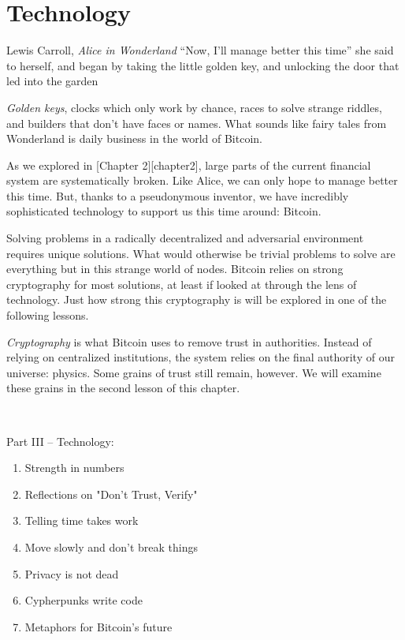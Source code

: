 \part{Technology}
\label{ch:technology}

\begin{chapquote}{Lewis Carroll, \textit{Alice in Wonderland}}
``Now, I'll manage better this time'' she said to herself, and began by taking
the little golden key, and unlocking the door that led into the garden
\end{chapquote}

\textit{Golden keys}, clocks which only work by chance, races to solve
strange riddles, and builders that don't have faces or names. What sounds like
fairy tales from Wonderland is daily business in the world of Bitcoin.

As we explored in [Chapter 2][chapter2], large parts of the current financial
system are systematically broken. Like Alice, we can only hope to manage better
this time. But, thanks to a pseudonymous inventor, we have incredibly
sophisticated technology to support us this time around: Bitcoin.

Solving problems in a radically decentralized and adversarial environment
requires unique solutions. What would otherwise be trivial problems to solve
are everything but in this strange world of nodes. Bitcoin relies on strong
cryptography for most solutions, at least if looked at through the lens of
technology. Just how strong this cryptography is will be explored in one of the
following lessons.

\textit{Cryptography} is what Bitcoin uses to remove trust in authorities.
Instead of relying on centralized institutions, the system relies on the final
authority of our universe: physics. Some grains of trust still remain, however.
We will examine these grains in the second lesson of this chapter.

~

Part III -- Technology:

\begin{enumerate}
  \item Strength in numbers
  \item Reflections on "Don't Trust, Verify"
  \item Telling time takes work
  \item Move slowly and don't break things
  \item Privacy is not dead
  \item Cypherpunks write code
  \item Metaphors for Bitcoin's future
\end{enumerate}

